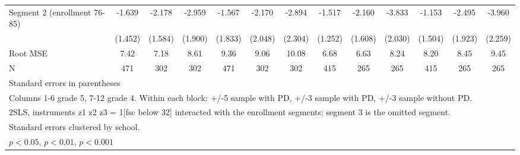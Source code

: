 {\begin{tabular}{l*{12}{c}}
\addlinespace
Segment 2 (enrollment 76-85)&      -1.639         &      -2.178         &      -2.959         &      -1.567         &      -2.170         &      -2.894         &      -1.517         &      -2.160         &      -3.833         &      -1.153         &      -2.495         &      -3.960         \\
            &     (1.452)         &     (1.584)         &     (1.900)         &     (1.833)         &     (2.048)         &     (2.304)         &     (1.252)         &     (1.608)         &     (2.030)         &     (1.504)         &     (1.923)         &     (2.259)         \\
\midrule
Root MSE    &        7.42         &        7.18         &        8.61         &        9.36         &        9.06         &       10.08         &        6.68         &        6.63         &        8.24         &        8.20         &        8.45         &        9.45         \\
N           &         471         &         302         &         302         &         471         &         302         &         302         &         415         &         265         &         265         &         415         &         265         &         265         \\
\bottomrule
\multicolumn{13}{l}{\footnotesize Standard errors in parentheses}\\
\multicolumn{13}{l}{\footnotesize Columns 1-6 grade 5, 7-12 grade 4. Within each block: +/-5 sample with PD, +/-3 sample with PD, +/-3 sample without PD.}\\
\multicolumn{13}{l}{\footnotesize 2SLS, instruments z1 z2 z3 = 1[fsc below 32] interacted with the enrollment segments; segment 3 is the omitted segment.}\\
\multicolumn{13}{l}{\footnotesize Standard errors clustered by school.}\\
\multicolumn{13}{l}{\footnotesize \sym{*} \(p<0.05\), \sym{**} \(p<0.01\), \sym{***} \(p<0.001\)}\\
\end{tabular}
}
